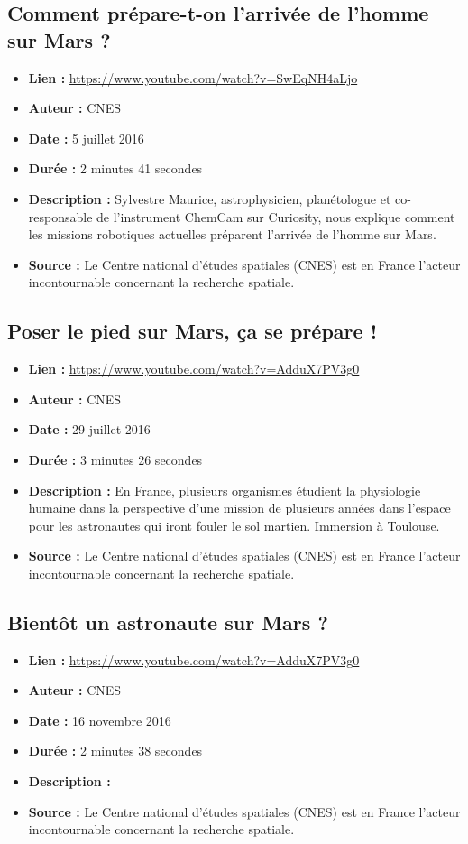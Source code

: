 \documentclass[8pt]{article}
\begin{document}
\subsection{Comment prépare-t-on l'arrivée de l'homme sur Mars ?}
\begin{itemize}
	\item \textbf{Lien : }  \url{https://www.youtube.com/watch?v=SwEqNH4aLjo} 
	\item \textbf{Auteur : } CNES
	\item \textbf{Date : } 5 juillet 2016
	\item \textbf{Durée : } 2 minutes 41 secondes
	\item \textbf{Description : } Sylvestre Maurice, astrophysicien, planétologue et co-responsable de l'instrument ChemCam sur Curiosity, nous explique comment les missions robotiques actuelles préparent l'arrivée de l'homme sur Mars.
	\item \textbf{Source : } Le Centre national d'études spatiales (CNES) est en France l'acteur incontournable concernant la recherche spatiale. 
\end{itemize}

\subsection{Poser le pied sur Mars, ça se prépare !}
\begin{itemize}
	\item \textbf{Lien : }  \url{https://www.youtube.com/watch?v=AdduX7PV3g0} 
	\item \textbf{Auteur : } CNES
	\item \textbf{Date : } 29 juillet 2016
	\item \textbf{Durée : } 3 minutes 26 secondes
	\item \textbf{Description : } En France, plusieurs organismes étudient la physiologie humaine dans la perspective d'une mission de plusieurs années dans l'espace pour les astronautes qui iront fouler le sol martien. Immersion à Toulouse. 
	\item \textbf{Source : } Le Centre national d'études spatiales (CNES) est en France l'acteur incontournable concernant la recherche spatiale. 
\end{itemize}

\subsection{Bientôt un astronaute sur Mars ?}
\begin{itemize}
	\item \textbf{Lien : }  \url{https://www.youtube.com/watch?v=AdduX7PV3g0} 
	\item \textbf{Auteur : } CNES
	\item \textbf{Date : } 16 novembre 2016
	\item \textbf{Durée : } 2 minutes 38 secondes
	\item \textbf{Description : } 
	\item \textbf{Source : } Le Centre national d'études spatiales (CNES) est en France l'acteur incontournable concernant la recherche spatiale. 
\end{itemize}
\end{document}
